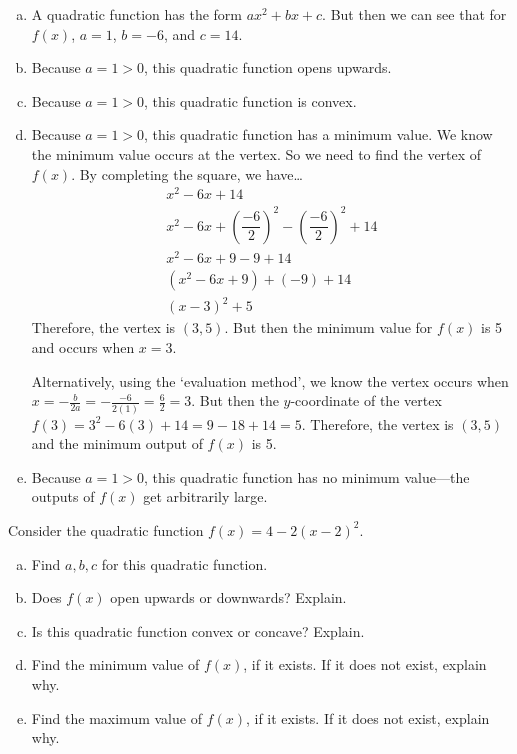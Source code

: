 \documentclass[11pt,letterpaper]{article}
\begin{document}
\sol 
\begin{enumerate}[(a)]
\item A quadratic function has the form $ax^2 + bx + c$. But then we can see that for $f(x)$, $a= 1$, $b= -6$, and $c= 14$. \pspace

\item Because $a= 1 > 0$, this quadratic function opens upwards. \pspace

\item Because $a= 1 > 0$, this quadratic function is convex. \pspace

\item Because $a= 1 > 0$, this quadratic function has a minimum value. We know the minimum value occurs at the vertex. So we need to find the vertex of $f(x)$. By completing the square, we have\dots
	\[
	\begin{gathered}
	x^2 - 6x + 14 \\
	x^2 - 6x + \left( \dfrac{-6}{2} \right)^2 - \left( \dfrac{-6}{2} \right)^2 + 14 \\
	x^2 - 6x + 9 - 9 + 14 \\
	(x^2 - 6x + 9) + (-9) + 14 \\
	(x - 3)^2 + 5
	\end{gathered}
	\]
Therefore, the vertex is $(3, 5)$. But then the minimum value for $f(x)$ is 5 and occurs when $x= 3$. \pspace

Alternatively, using the `evaluation method', we know the vertex occurs when $x= -\frac{b}{2a}= -\frac{-6}{2(1)}= \frac{6}{2}= 3$. But then the $y$-coordinate of the vertex $f(3)= 3^2 - 6(3) + 14= 9 - 18 + 14= 5$. Therefore, the vertex is $(3, 5)$ and the minimum output of $f(x)$ is 5. \pspace

\item Because $a= 1 > 0$, this quadratic function has no minimum value---the outputs of $f(x)$ get arbitrarily large. 
\end{enumerate}



\newpage



 Consider the quadratic function $f(x)= 4 - 2(x - 2)^2$.
	\begin{enumerate}[(a)]
	\item Find $a, b, c$ for this quadratic function.
	\item Does $f(x)$ open upwards or downwards? Explain.
	\item Is this quadratic function convex or concave? Explain. 
	\item Find the minimum value of $f(x)$, if it exists. If it does not exist, explain why.  
	\item Find the maximum value of $f(x)$, if it exists. If it does not exist, explain why. 
	\end{enumerate} \pspace
\end{document}
